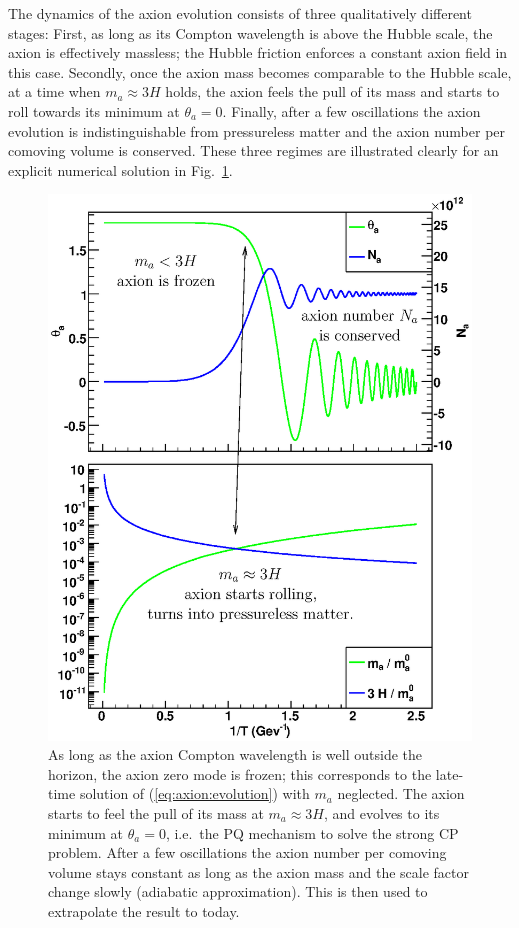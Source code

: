 \documentclass[preprint,nofootinbib]{revtex4}
\newcommand{\reffig}[1]{Fig.~\ref{#1}}
\begin{document}
The dynamics of the axion evolution consists of three qualitatively different stages: First, as long as its Compton wavelength is above the Hubble scale, the axion is effectively massless; the Hubble friction enforces a constant axion field in this case. Secondly, once the axion mass becomes comparable to the Hubble scale, at a time when $m_a \approx 3H$ holds, the axion feels the pull of its mass and starts to roll towards its minimum at $\theta_a=0$. Finally, after a few oscillations the axion evolution is indistinguishable from pressureless matter and the axion number per comoving volume is conserved. These three regimes are illustrated clearly for an explicit numerical solution in \reffig{fig:dynamics}. 

\begin{figure}[tbp]
\begin{center}
 \includegraphics[width=\figwidth,clip=true,trim=0mm 0mm 15mm 10mm]{dynamics.eps}
\end{center}
\caption{As long as the axion Compton wavelength is well outside the horizon, the axion zero mode is frozen; this corresponds to the late-time solution of (\ref{eq:axion:evolution}) with $m_a$ neglected. The axion starts to feel the pull of its mass at $m_a \approx 3H$, and evolves to its minimum at $\theta_a=0$, i.e.\ the PQ mechanism to solve the strong CP problem. After a few oscillations the axion number per comoving volume stays constant as long as the axion mass and the scale factor change slowly (adiabatic approximation). This is then used to extrapolate the result to today.}\label{fig:dynamics}
\end{figure}
\end{document}
